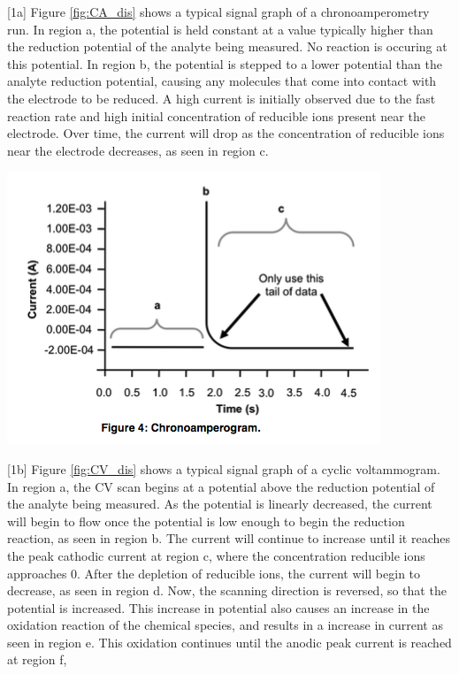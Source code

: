 \documentclass{article}
\begin{document}
\begin{multicols}{2}
{[1a] Figure \ref{fig:CA_dis} shows a typical signal graph of a chronoamperometry
run. In region a, the potential is held constant at a value typically higher
than the reduction potential of the analyte being measured. No reaction is
occuring at this potential.
In region b, the potential is stepped to a lower potential than the analyte reduction
potential, causing any molecules that come into contact with the electrode to be
reduced. A high current is initially observed due to the fast reaction rate and high
initial concentration of reducible ions present near the electrode. 
Over time, the current will drop as the concentration of reducible ions near the
electrode decreases, as seen in region c.
\begin{center}
    \includegraphics[scale=0.4]{CA_dis}
    \label{fig:CA_dis}
\end{center}
[1b] Figure \ref{fig:CV_dis} shows a typical signal graph of a cyclic
voltammogram. In region a, the CV scan begins at a potential above the reduction
potential of the analyte being measured. As the potential is linearly decreased,
the current will begin to flow once the potential is low enough to begin the
reduction reaction, as seen in region b. The current will continue to increase
until it reaches the peak cathodic current at region c, where the concentration
reducible ions approaches 0. After the depletion of reducible ions, the current
will begin to decrease, as seen in region d. 
Now, the scanning direction is reversed, so that the potential is increased.
This increase in potential also causes an increase in the oxidation reaction of
the chemical species, and results in a increase in current as seen in region e.
This oxidation continues until the anodic peak current is reached at region f,
}
\end{multicols}
\end{document}
